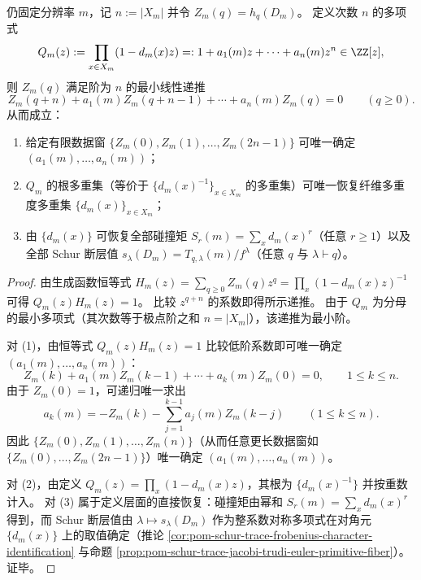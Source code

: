 \begin{proposition}\label{prop:pom-trivial-channel-finite-decidability}
仍固定分辨率 \(m\)，记 \(n:=|X_m|\) 并令 \(Z_m(q)=h_q(D_m)\)。
定义次数 \(n\) 的多项式
\[
Q_m(z):=\prod_{x\in X_m}(1-d_m(x)z)=:1+a_1(m)z+\cdots+a_n(m)z^n\in\ZZ[z],
\]
则 \(Z_m(q)\) 满足阶为 \(n\) 的最小线性递推
\[
Z_m(q+n)+a_1(m)Z_m(q+n-1)+\cdots+a_n(m)Z_m(q)=0\qquad(q\ge 0).
\]
从而成立：
\begin{enumerate}
  \item 给定有限数据窗 \(\{Z_m(0),Z_m(1),\dots,Z_m(2n-1)\}\) 可唯一确定 \((a_1(m),\dots,a_n(m))\)；
  \item \(Q_m\) 的根多重集（等价于 \(\{d_m(x)^{-1}\}_{x\in X_m}\) 的多重集）可唯一恢复纤维多重度多重集 \(\{d_m(x)\}_{x\in X_m}\)；
  \item 由 \(\{d_m(x)\}\) 可恢复全部碰撞矩 \(S_r(m)=\sum_x d_m(x)^r\)（任意 \(r\ge 1\)）以及全部 Schur 断层值 \(s_\lambda(D_m)=T_{q,\lambda}(m)/f^\lambda\)（任意 \(q\) 与 \(\lambda\vdash q\)）。
\end{enumerate}
\end{proposition}
\begin{proof}
由生成函数恒等式
\(
H_m(z)=\sum_{q\ge 0}Z_m(q)z^q=\prod_x(1-d_m(x)z)^{-1}
\)
可得 \(Q_m(z)H_m(z)=1\)。
比较 \(z^{q+n}\) 的系数即得所示递推。
由于 \(Q_m\) 为分母的最小多项式（其次数等于极点阶之和 \(n=|X_m|\)），该递推为最小阶。
\par
对 (1)，由恒等式 \(Q_m(z)H_m(z)=1\) 比较低阶系数即可唯一确定 \((a_1(m),\dots,a_n(m))\)：
\[
Z_m(k)+a_1(m)Z_m(k-1)+\cdots+a_k(m)Z_m(0)=0,\qquad 1\le k\le n.
\]
由于 \(Z_m(0)=1\)，可递归唯一求出
\[
a_k(m)=-Z_m(k)-\sum_{j=1}^{k-1}a_j(m)Z_m(k-j)\qquad(1\le k\le n).
\]
因此 \(\{Z_m(0),Z_m(1),\dots,Z_m(n)\}\)（从而任意更长数据窗如 \(\{Z_m(0),\dots,Z_m(2n-1)\}\)）唯一确定 \((a_1(m),\dots,a_n(m))\)。
\par
对 (2)，由定义 \(Q_m(z)=\prod_x(1-d_m(x)z)\)，其根为 \(\{d_m(x)^{-1}\}\) 并按重数计入。
对 (3) 属于定义层面的直接恢复：碰撞矩由幂和 \(S_r(m)=\sum_x d_m(x)^r\) 得到，而 Schur 断层值由 \(\lambda\mapsto s_\lambda(D_m)\) 作为整系数对称多项式在对角元 \(\{d_m(x)\}\) 上的取值确定（推论 \ref{cor:pom-schur-trace-frobenius-character-identification} 与命题 \ref{prop:pom-schur-trace-jacobi-trudi-euler-primitive-fiber}）。证毕。
\end{proof}

